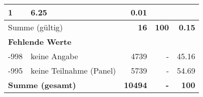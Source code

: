 \begin{longtable}{lXrrr}
       \num{1} &
       \num[round-mode=places,round-precision=2]{6,25} &
         \num[round-mode=places,round-precision=2]{0,01} \\
     \midrule
     \multicolumn{2}{l}{Summe (gültig)} &
       \textbf{\num{16}} &
     \textbf{100} &
       \textbf{\num[round-mode=places,round-precision=2]{0,15}} \\
     \multicolumn{5}{l}{\textbf{Fehlende Werte}}\\
       -998 &
       keine Angabe &
         \num{4739} &
        - &
         \num[round-mode=places,round-precision=2]{45,16} \\
       -995 &
       keine Teilnahme (Panel) &
         \num{5739} &
        - &
         \num[round-mode=places,round-precision=2]{54,69} \\
     \midrule
     \multicolumn{2}{l}{\textbf{Summe (gesamt)}} &
          \textbf{\num{10494}} &
        \textbf{-} &
        \textbf{100} \\
     \bottomrule
     \end{longtable}
     

